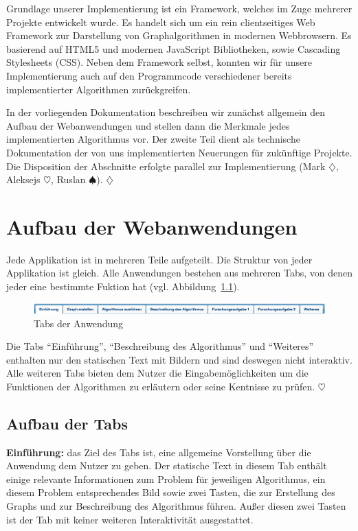 Grundlage unserer Implementierung ist ein Framework, welches im Zuge mehrerer Projekte entwickelt wurde. Es handelt sich um ein rein clientseitiges Web Framework zur Darstellung von Graphalgorithmen in modernen Webbrowsern. Es basierend auf HTML5 und modernen Java\-Script Bibliotheken, sowie Cascading Stylesheets (CSS). Neben dem Framework selbst, konnten wir für unsere Implementierung auch auf den Programmcode verschiedener bereits implementierter Algorithmen zurückgreifen.

In der vorliegenden Dokumentation beschreiben wir zunächst allgemein den Aufbau der Webanwendungen und stellen dann die Merkmale jedes implementierten Algorithmus vor. Der zweite Teil dient als technische Dokumentation der von uns implementierten Neuerungen für zukünftige Projekte. Die Disposition der Abschnitte erfolgte parallel zur Implementierung (Mark $\diamondsuit$, Aleksejs $\heartsuit$, Ruslan $\spadesuit$). \hfill$\diamondsuit$

\chapter{Aufbau der Webanwendungen} %
Jede Applikation ist in mehreren Teile aufgeteilt. Die Struktur von jeder Applikation ist gleich. Alle Anwendungen bestehen aus mehreren Tabs, von denen jeder eine bestimmte Fuktion hat (vgl. Abbildung~\ref{fig:tabs}).

\begin{figure}[h!]
	\centering
	\includegraphics[width=\textwidth]{figures/tabs}
	\caption[Tabs der Anwendung]{Tabs der Anwendung}\label{fig:tabs}
\end{figure}

Die Tabs \enquote{Einführung}, \enquote{Beschreibung des Algorithmus} und \enquote{Weiteres} enthalten nur den statischen Text mit Bildern und sind deswegen nicht interaktiv. Alle weiteren Tabs bieten dem Nutzer die Eingabemöglichkeiten um die Funktionen der Algorithmen zu erläutern oder seine Kentnisse zu prüfen. \hfill$\heartsuit$

\section{Aufbau der Tabs} %
\textbf{Einführung:} das Ziel des Tabs ist, eine allgemeine Vorstellung über die Anwendung dem Nutzer zu geben. Der statische Text in diesem Tab enthält einige relevante Informationen zum Problem für jeweiligen Algorithmus, ein diesem Problem entsprechendes Bild sowie zwei Tasten, die zur Erstellung des Graphs und zur Beschreibung des Algorithmus führen. Außer diesen zwei Tasten ist der Tab mit keiner weiteren Interaktivität ausgestattet.

